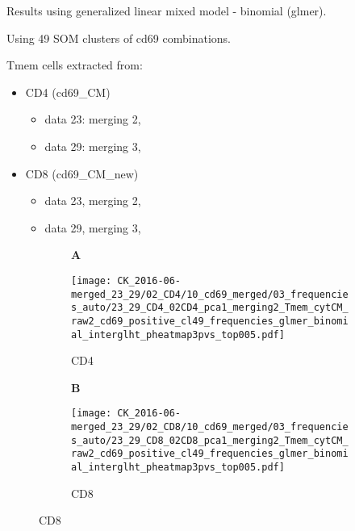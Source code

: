 \documentclass[a4paper, 12pt]{article}
\begin{document}
\pagestyle{empty}



Results using generalized linear mixed model - binomial (glmer).

Using 49 SOM clusters of cd69 combinations. 


Tmem cells extracted from:
\begin{itemize}
  \item  CD4 (cd69\_CM)
      \begin{itemize}
      \item data 23: merging 2, 
      \item data 29: merging 3,
    \end{itemize}

  \item  CD8 (cd69\_CM\_new)
  \begin{itemize}
  \item data 23, merging 2,
  \item data 29, merging 3, 
\end{itemize}
  
\end{itemize}


\begin{figure}[!thb]
\centering

    \begin{subfigure}[t]{0.02\textwidth}
    \vskip 0pt
        \textbf{\textsf{\normalsize A}}
    \end{subfigure}
    \begin{subfigure}[t]{0.45\textwidth}
    \vskip 0pt
    \caption{CD4}
        \texttt{[image: CK\_2016-06-merged\_23\_29/02\_CD4/10\_cd69\_merged/03\_frequencies\_auto/23\_29\_CD4\_02CD4\_pca1\_merging2\_Tmem\_cytCM\_raw2\_cd69\_positive\_cl49\_frequencies\_glmer\_binomial\_interglht\_pheatmap3pvs\_top005.pdf]}
    \end{subfigure}
\quad
    \begin{subfigure}[t]{0.02\textwidth}
    \vskip 0pt
        \textbf{\textsf{\normalsize B}}
    \end{subfigure}
    \begin{subfigure}[t]{0.45\textwidth}
    \vskip 0pt
    \caption{CD8}
        \texttt{[image: CK\_2016-06-merged\_23\_29/02\_CD8/10\_cd69\_merged/03\_frequencies\_auto/23\_29\_CD8\_02CD8\_pca1\_merging2\_Tmem\_cytCM\_raw2\_cd69\_positive\_cl49\_frequencies\_glmer\_binomial\_interglht\_pheatmap3pvs\_top005.pdf]}
    \end{subfigure}
    
    
\end{figure}
\end{document}
